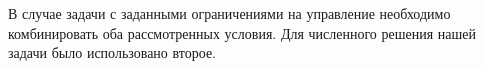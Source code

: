 \documentclass[../../doc.tex]{subfiles}
\begin{document}
    \begin{remark}
        В случае задачи с заданными ограничениями на управление необходимо комбинировать оба рассмотренных условия.
        Для численного решения нашей задачи было использовано второе.
    \end{remark}

    \ifSubfilesClassLoaded{
        \nocite{*}
        \clearpage
        
        
    }{}
\end{document}
